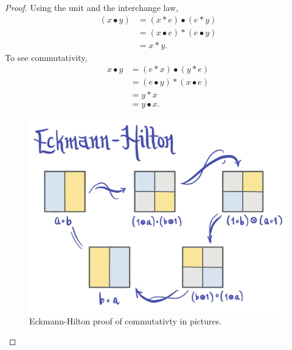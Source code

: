 \documentclass{article}[11pt]
\renewcommand{\dot}{\bullet }
\begin{document}
	\begin{proof} Using the unit and the interchange law,
	\begin{align*}
		(x\dot y) &= (x\ast e)\dot (e\ast y) \\
		&= (x\dot e) \ast (e\dot y) \\
		&= x\ast y.
	\end{align*}
	To see commutativity,
	\begin{align*}
		x\dot y &= (e\ast x)\dot (y\ast e) \\
		&= (e\dot y)\ast (x\dot e) \\
		&= y\ast x \\
		&= y\dot x.
	\end{align*}
		\begin{figure}[h]
  \includegraphics[scale=.13]{pics/eckmann-hilton.png}
  \centering
  \caption{Eckmann-Hilton proof of commutativty in pictures.}
  \label{fig:eckmann}
\end{figure}
	\end{proof}
\end{document}
